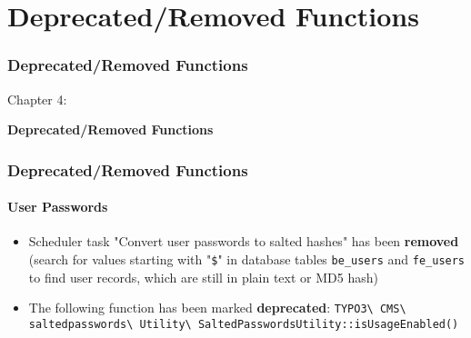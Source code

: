 %

\section{Deprecated/Removed Functions}
\begin{frame}[fragile]
	\frametitle{Deprecated/Removed Functions}

	\begin{center}\huge{Chapter 4:}\end{center}
	\begin{center}\huge{\color{typo3darkgrey}\textbf{Deprecated/Removed Functions}}\end{center}

\end{frame}


\begin{frame}[fragile]
	\frametitle{Deprecated/Removed Functions}
	\framesubtitle{User Passwords}

	\begin{itemize}
		\item Scheduler task "Convert user passwords to salted hashes"
			has been \textbf{removed}\newline
			\smaller
				(search for values starting with "\texttt{\$}" in database tables
				\texttt{be\_users} and \texttt{fe\_users} to find user records,
				which are still in plain text or MD5 hash)
			\normalsize
		\item The following function has been marked \textbf{deprecated}:\newline
			\fontsize{7.5pt}{10}\selectfont
				\texttt{TYPO3\textbackslash
					CMS\textbackslash
					saltedpasswords\textbackslash
					Utility\textbackslash
					SaltedPasswordsUtility::isUsageEnabled()}
			\normalsize

	\end{itemize}

\end{frame}

